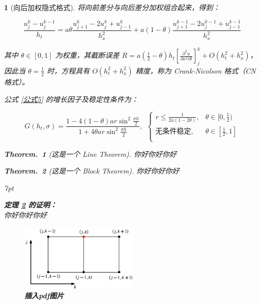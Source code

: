 \documentclass[UTF8]{report}
\theoremstyle{MyLineTheoremStyle} %
\newtheorem{LineTheorem}{Theorem.\,}
\theoremstyle{MyBlockTheoremStyle} %
\newtheorem{BlockTheorem}[LineTheorem]{Theorem.\,} %
\theoremstyle{MySubsubsectionStyle} %
\newtheorem{definition}{}
\newenvironment{graybox}{%
        \def\FrameCommand{%
        \hspace{1pt}%
        {\color{gray}\small \vrule width 2pt}%
        {\color{graybox_color}\vrule width 4pt}%
        \colorbox{graybox_color}%
        }%
        \MakeFramed{\advance\hsize-\width\FrameRestore}%
        \noindent\hspace{-4.55pt}%
        \begin{adjustwidth}{}{7pt}%
        \vspace{2pt}\vspace{2pt}%
        }
        {%
        \vspace{2pt}\end{adjustwidth}\endMakeFramed%
        }
\begin{document}
\begin{definition}[向后加权隐式格式]

将向前差分与向后差分加权组合起来，得到：

\begin{equation}\label{公式5}
    \frac{u_{j}^{k}-u_{j}^{k-1}}{h_t}=a\theta\frac{u_{j+1}^{k}-2u_{j}^{k}+u_{j-1}^{k}}{h_x^2}+a(1-\theta)\frac{u_{j+1}^{k-1}-2u_{j}^{k-1}+u_{j-1}^{k-1}}{h_x^2}
\end{equation}

其中 $\theta \in [0, 1]$ 为权重，其截断误差 $R = a\left(\frac{1}{2}-\theta\right)h_t\left[\frac{\partial^{3}u}{\partial x^{2}\partial t}\right]_{j}^{k}+O(h_t^{2}+h_x^2)$，因此当 $\theta = \frac{1}{2}$ 时，方程具有 $O(h_t^{2}+h_x^2)$ 精度，称为 Crank-Nicolson 格式（CN 格式）。


公式 \ref{公式5} 的增长因子及稳定性条件为：

\begin{equation}
    G(h_t,\sigma)=\frac{1-4(1-\theta)ar\sin^2\frac{\sigma h}2}{1+4\theta ar\sin^2\frac{\sigma h}2}, \ \ 
    \begin{cases}
        r\leqslant\frac{1}{2a(1-2\theta)}, & \theta \in [0, \frac{1}{2}) \\ 
        \text{无条件稳定}, & \theta \in [\frac{1}{2}, 1] \\ 
    \end{cases}
\end{equation}


\begin{LineTheorem}[这是一个 Line Theorem]\label{这是一个 Line Theorem}
    你好你好你好
\end{LineTheorem}

\begin{BlockTheorem}[这是一个 Block Theorem]\label{这是一个 Block Theorem}
    你好你好你好
\end{BlockTheorem}



\begin{graybox}
\textbf{定理 \ref{这是一个 Block Theorem} 的证明：}\\
你好你好你好
\end{graybox}

\begin{figure}[H]
    \centering
    \includegraphics[width=0.5\textwidth]{assets/差分格式示意图.pdf}
    \caption{\textbf{插入pdf图片}}\label{插入pdf图片}
\end{figure}


\end{definition}
\end{document}
